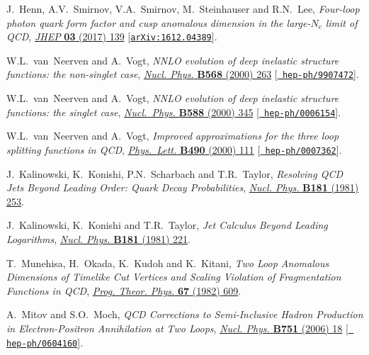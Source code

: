 \documentclass[12pt]{article}
\begin{document}
{\begin{thebibliography}{100}
J.~Henn, A.V.~Smirnov, V.A.~Smirnov, M.~Steinhauser and R.N.~Lee,
  \emph{{Four-loop photon quark form factor and cusp anomalous dimension in the
  large-$N_c$ limit of QCD}},
  \href{https://dx.doi.org/10.1007/JHEP03(2017)139}{\emph{JHEP} {\bf 03} (2017)
  139} [\href{https://arxiv.org/abs/1612.04389}{{\tt arXiv:1612.04389}}].

W.L.~van~Neerven and A.~Vogt, \emph{{NNLO evolution of deep inelastic structure
  functions: the non-singlet case}},
  \href{https://dx.doi.org/10.1016/S0550-3213(99)00668-9}{\emph{Nucl. Phys.}
  {\bf B568} (2000) 263} [\href{https://arxiv.org/abs/hep-ph/9907472}{{\tt
  hep-ph/9907472}}].

W.L.~van~Neerven and A.~Vogt, \emph{{NNLO evolution of deep inelastic structure
  functions: the singlet case}},
  \href{https://dx.doi.org/10.1016/S0550-3213(00)00480-6}{\emph{Nucl.~Phys.}
  {\bf B588} (2000) 345} [\href{https://arxiv.org/abs/hep-ph/0006154}{{\tt
  hep-ph/0006154}}].

W.L.~van~Neerven and A.~Vogt, \emph{{Improved approximations for the three loop
  splitting functions in QCD}},
  \href{https://dx.doi.org/10.1016/S0370-2693(00)00953-9}{\emph{Phys.~Lett.}
  {\bf B490} (2000) 111} [\href{https://arxiv.org/abs/hep-ph/0007362}{{\tt
  hep-ph/0007362}}].

J.~Kalinowski, K.~Konishi, P.N.~Scharbach and T.R.~Taylor, \emph{{Resolving QCD
  Jets Beyond Leading Order: Quark Decay Probabilities}},
  \href{https://dx.doi.org/10.1016/0550-3213(81)90352-7}{\emph{Nucl. Phys.}
  {\bf B181} (1981) 253}.

J.~Kalinowski, K.~Konishi and T.R.~Taylor, \emph{{Jet Calculus Beyond Leading
  Logarithms}},
  \href{https://dx.doi.org/10.1016/0550-3213(81)90351-5}{\emph{Nucl. Phys.}
  {\bf B181} (1981) 221}.

T.~Munehisa, H.~Okada, K.~Kudoh and K.~Kitani, \emph{{Two Loop Anomalous
  Dimensions of Timelike Cut Vertices and Scaling Violation of Fragmentation
  Functions in {QCD}}},
  \href{https://dx.doi.org/10.1143/PTP.67.609}{\emph{Prog. Theor. Phys.} {\bf
  67} (1982) 609}.

A.~Mitov and S.O.~Moch, \emph{{QCD Corrections to Semi-Inclusive Hadron
  Production in Electron-Positron Annihilation at Two Loops}},
  \href{https://dx.doi.org/10.1016/j.nuclphysb.2006.05.018}{\emph{Nucl. Phys.}
  {\bf B751} (2006) 18} [\href{https://arxiv.org/abs/hep-ph/0604160}{{\tt
  hep-ph/0604160}}].


\end{thebibliography}}
\end{document}
